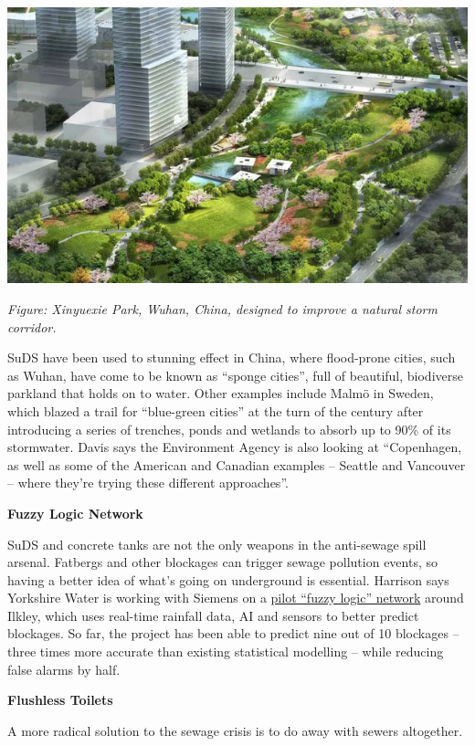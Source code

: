 \documentclass[
]{book}
\begin{document}
\includegraphics{fig/Wuhan-Storm_Corridor.png}

\emph{Figure: Xinyuexie Park, Wuhan, China, designed to improve a natural storm corridor.}

SuDS have been used to stunning effect in China, where flood-prone cities, such as Wuhan, have come to be known as ``sponge cities'', full of beautiful, biodiverse parkland that holds on to water. Other examples include Malmö in Sweden, which blazed a trail for ``blue-green cities'' at the turn of the century after introducing a series of trenches, ponds and wetlands to absorb up to 90\% of its stormwater. Davis says the Environment Agency is also looking at ``Copenhagen, as well as some of the American and Canadian examples -- Seattle and Vancouver -- where they're trying these different approaches''.

\textbf{Fuzzy Logic Network}

SuDS and concrete tanks are not the only weapons in the anti-sewage spill arsenal. Fatbergs and other blockages can trigger sewage pollution events, so having a better idea of what's going on underground is essential. Harrison says Yorkshire Water is working with Siemens on a \href{https://www.waterindustryjournal.co.uk/fuzzy-logic-clear-up-blockage-prediction-for-yorkshire-water}{pilot ``fuzzy logic'' network} around Ilkley, which uses real-time rainfall data, AI and sensors to better predict blockages. So far, the project has been able to predict nine out of 10 blockages -- three times more accurate than existing statistical modelling -- while reducing false alarms by half.

\textbf{Flushless Toilets}

A more radical solution to the sewage crisis is to do away with sewers altogether.
\end{document}
